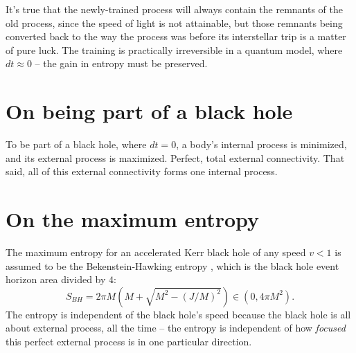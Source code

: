 \documentclass[12pt]{article}
\begin{document}
It's true that the newly-trained process will always contain the remnants of the old process, since the speed of light is not attainable, but those remnants being converted back to the way the process was before its interstellar trip is a matter of pure luck.
The training is practically irreversible in a quantum model, where $dt \approx 0$ -- the gain in entropy must be preserved.






\section{On being part of a black hole}
To be part of a black hole, where $dt = 0$, a body's internal process is minimized, and its external process is maximized.
Perfect, total external connectivity.
That said, all of this external connectivity forms one internal process.



\section{On the maximum entropy}

The maximum entropy for an accelerated Kerr black hole of any speed $v < 1$ is assumed to be the Bekenstein-Hawking entropy \cite{jacobson}, which is the black hole event horizon area divided by $4$:
\begin{equation}
S_{BH} = 2 \pi M \left(M + \sqrt{M^2 - (J/M)^2}\right) \in (0, 4\pi M^2).
\end{equation}
The entropy is independent of the black hole's speed because the black hole is all about external process, all the time -- the entropy is independent of how \textit{focused} this perfect external process is in one particular direction.
\end{document}

